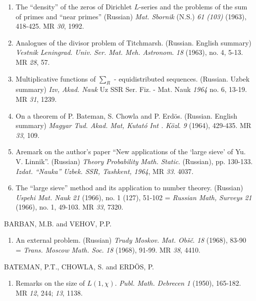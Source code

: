 \begin{thebibliography}{99}
\begin{enumerate}
\item The ``density'' of the zeros of Dirichlet $L$-series and the
  problems of the sum of primes and ``near primes'' (Russian)
  \textit{Mat. Sbornik} (N.S.) {\em 61 (103)} (1963), 418-425. MR {\em
    30}, 1992.  

\item Analogues of the divisor problem of
  Titchmarsh. (Russian. English summary) \textit{Vestnik
    Leningrad. Univ. Ser. Mat. Meh. Astronom}. {\em 18} (1963), no. 4,
  5-13. MR {\em 28}, 57. 

\item Multiplicative functions of $\sum_R$ - equidistributed
  sequences. (Russian. Uzbek summary) \textit{Izv, Akad. Nauk} Uz
  SSR Ser. Fiz. - Mat. Nauk {\em 1964} no. 6, 13-19. MR {\em 31}, 1239. 

\item On a theorem of P. Bateman, S. Chowla and
  P. Erd\"{o}s. (Russian. English summary) \textit{Magyar
  Tud. Akad. Mat, Kutat\'o Int . K\"ozl}. {\em 9} (1964), 429-435. MR
  {\em 33}, 109.   

\item A\pageoriginale remark on the author's paper  ``New applications of the
  `large sieve' of Yu. V. Linnik''. (Russian) \textit{Theory
  Probability Math. Static}. (Russian),
  pp. 130-133. \textit{Izdat. ``Nauka'' Uzbek. SSR, Tashkent, 1964},
  MR {\em 33}. 4037. 

\item The  ``large sieve'' method and its application to number
  theorey.  (Russian) \textit{Uspehi Mat. Nauk 21} (1966), no.
  1 (127), 51-102 =  \textit{Russian Math, Surveys 21} (1966),
  no. 1, 49-103. MR {\em 33}, 7320.   
\end{enumerate}

 BARBAN, M.B. and VEHOV, P.P.
\begin{enumerate}
\item An external problem. (Russian) \textit{Trudy
  Moskov. Mat. Ob\v{s}\v{c}}. {\em 18} (1968), 83-90 =
  \textit{Trans. Moscow Math. Soc}. {\em 18} (1968), 91-99. MR {\em
    38}, 4410. 
\end{enumerate}

 BATEMAN, P.T., CHOWLA, S. and ERD\"{O}S, P.
\begin{enumerate}
\item Remarks on the size of
  $L(1,\chi)$. \textit{Publ. Math. Debrecen} {\em 1} (1950),
  165-182. MR {\em 12}, 244; {\em 13}, 1138.
 \end{enumerate}
 

\end{thebibliography}
